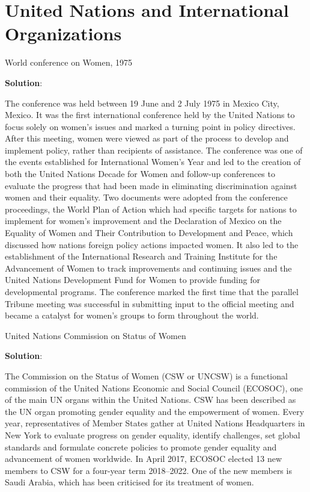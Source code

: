 \documentclass[
  openany]{book}
\newcommand{\question}{\item}
\newenvironment{solution}{ {\bfseries Solution}:}{}
\begin{document}
\hypertarget{united-nations-and-international-organizations}{%
\section{United Nations and International Organizations}\label{united-nations-and-international-organizations}}

\begin{questions}

\question World conference on Women, 1975

\begin{solution}

The conference was held between 19 June and 2 July 1975 in Mexico City, Mexico. It was the first international conference held by the United Nations to focus solely on women's issues and marked a turning point in policy directives. After this meeting, women were viewed as part of the process to develop and implement policy, rather than recipients of assistance. The conference was one of the events established for International Women's Year and led to the creation of both the United Nations Decade for Women and follow-up conferences to evaluate the progress that had been made in eliminating discrimination against women and their equality. Two documents were adopted from the conference proceedings, the World Plan of Action which had specific targets for nations to implement for women's improvement and the Declaration of Mexico on the Equality of Women and Their Contribution to Development and Peace, which discussed how nations foreign policy actions impacted women. It also led to the establishment of the International Research and Training Institute for the Advancement of Women to track improvements and continuing issues and the United Nations Development Fund for Women to provide funding for developmental programs. The conference marked the first time that the parallel Tribune meeting was successful in submitting input to the official meeting and became a catalyst for women's groups to form throughout the world.

\end{solution}

\question United Nations Commission on Status of Women

\begin{solution}

The Commission on the Status of Women (CSW or UNCSW) is a functional commission of the United Nations Economic and Social Council (ECOSOC), one of the main UN organs within the United Nations. CSW has been described as the UN organ promoting gender equality and the empowerment of women. Every year, representatives of Member States gather at United Nations Headquarters in New York to evaluate progress on gender equality, identify challenges, set global standards and formulate concrete policies to promote gender equality and advancement of women worldwide. In April 2017, ECOSOC elected 13 new members to CSW for a four-year term 2018–2022. One of the new members is Saudi Arabia, which has been criticised for its treatment of women.


\end{solution}
\end{questions}
\end{document}

